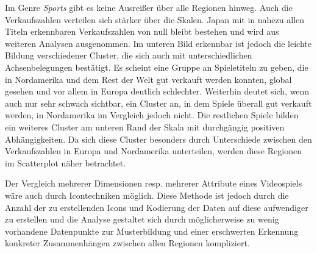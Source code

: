 \documentclass[usegeometry=true]{scrartcl}
\begin{document}
Im Genre \textit{Sports} gibt es keine Ausreißer über alle Regionen hinweg. Auch die Verkaufszahlen verteilen sich stärker über die Skalen. 
Japan mit in nahezu allen Titeln erkennbaren Verkaufszahlen von null bleibt bestehen und wird aus weiteren Analysen ausgenommen.
Im unteren Bild erkennbar ist jedoch die leichte Bildung verschiedener Cluster, die sich auch mit unterschiedlichen Achsenbelegungen bestätigt.
Es scheint eine Gruppe an Spieletiteln zu geben, die in Nordamerika und dem Rest der Welt gut verkauft werden konnten, global gesehen und vor allem in Europa deutlich schlechter.
Weiterhin deutet sich, wenn auch nur sehr schwach sichtbar, ein Cluster an, in dem Spiele überall gut verkauft werden, in Nordamerika im Vergleich jedoch nicht.
Die restlichen Spiele bilden ein weiteres Cluster am unteren Rand der Skala mit durchgängig positiven Abhängigkeiten. 
Da sich diese Cluster besonders durch Unterschiede zwischen den Verkaufszahlen in Europa und Nordamerika unterteilen, werden diese Regionen im Scatterplot näher betrachtet. 

Der Vergleich mehrerer Dimensionen resp. mehrerer Attribute eines Videospiels wäre auch durch Icontechniken möglich. 
Diese Methode ist jedoch durch die Anzahl der zu erstellenden Icons und Kodierung der Daten auf diese aufwendiger zu erstellen und die Analyse
gestaltet sich durch möglicherweise zu wenig vorhandene Datenpunkte zur Musterbildung und einer erschwerten Erkennung konkreter Zusammenhängen zwischen allen Regionen kompliziert.

\end{document}
